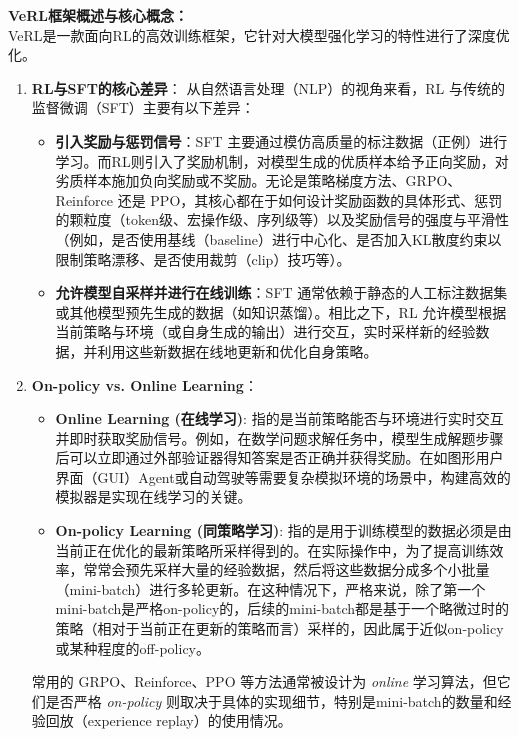 \documentclass{pkuthesis}
\begin{document}
\textbf{VeRL框架概述与核心概念：} \\
VeRL是一款面向RL的高效训练框架，它针对大模型强化学习的特性进行了深度优化。
\begin{enumerate}
    \item \textbf{RL与SFT的核心差异}：
    从自然语言处理（NLP）的视角来看，RL 与传统的监督微调（SFT）主要有以下差异：
    \begin{itemize}
        \item \textbf{引入奖励与惩罚信号}：SFT 主要通过模仿高质量的标注数据（正例）进行学习。而RL则引入了奖励机制，对模型生成的优质样本给予正向奖励，对劣质样本施加负向奖励或不奖励。无论是策略梯度方法、GRPO、Reinforce 还是 PPO，其核心都在于如何设计奖励函数的具体形式、惩罚的颗粒度（token级、宏操作级、序列级等）以及奖励信号的强度与平滑性（例如，是否使用基线（baseline）进行中心化、是否加入KL散度约束以限制策略漂移、是否使用裁剪（clip）技巧等）。
        \item \textbf{允许模型自采样并进行在线训练}：SFT 通常依赖于静态的人工标注数据集或其他模型预先生成的数据（如知识蒸馏）。相比之下，RL 允许模型根据当前策略与环境（或自身生成的输出）进行交互，实时采样新的经验数据，并利用这些新数据在线地更新和优化自身策略。
    \end{itemize}

    \item \textbf{On-policy vs. Online Learning}：
    \begin{itemize}
        \item \textbf{Online Learning (在线学习)}: 指的是当前策略能否与环境进行实时交互并即时获取奖励信号。例如，在数学问题求解任务中，模型生成解题步骤后可以立即通过外部验证器得知答案是否正确并获得奖励。在如图形用户界面（GUI）Agent或自动驾驶等需要复杂模拟环境的场景中，构建高效的模拟器是实现在线学习的关键。
        \item \textbf{On-policy Learning (同策略学习)}: 指的是用于训练模型的数据必须是由当前正在优化的最新策略所采样得到的。在实际操作中，为了提高训练效率，常常会预先采样大量的经验数据，然后将这些数据分成多个小批量（mini-batch）进行多轮更新。在这种情况下，严格来说，除了第一个mini-batch是严格on-policy的，后续的mini-batch都是基于一个略微过时的策略（相对于当前正在更新的策略而言）采样的，因此属于近似on-policy或某种程度的off-policy。
    \end{itemize}
    常用的 GRPO、Reinforce、PPO 等方法通常被设计为 \emph{online} 学习算法，但它们是否严格 \emph{on-policy} 则取决于具体的实现细节，特别是mini-batch的数量和经验回放（experience replay）的使用情况。


\end{enumerate}
\end{document}
